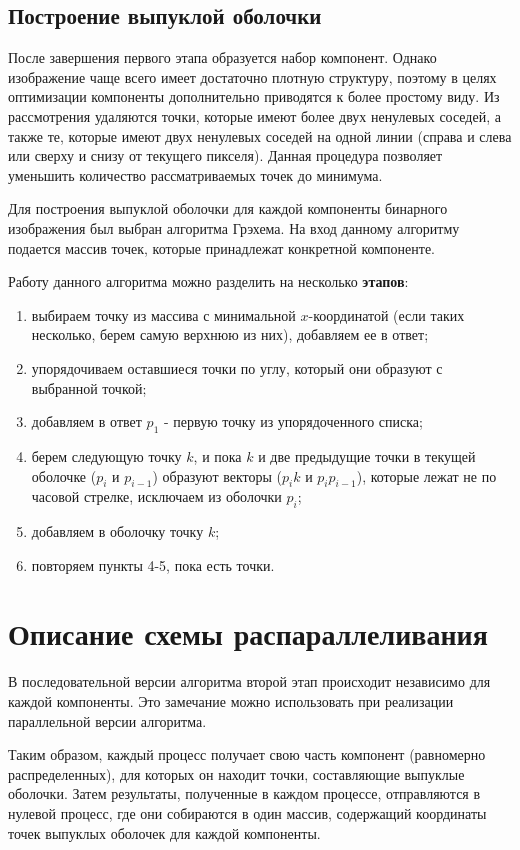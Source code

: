 \documentclass[a4paper, 12pt]{extarticle}
\newcommand{\n}{\par}
\begin{document}
	\subsection{Построение выпуклой оболочки}
	После завершения первого этапа образуется набор компонент. Однако изображение чаще всего имеет достаточно плотную структуру, поэтому в целях оптимизации компоненты дополнительно приводятся к более простому виду. Из рассмотрения удаляются точки, которые имеют более двух ненулевых соседей, а также те, которые имеют двух ненулевых соседей на одной линии (справа и слева или сверху и снизу от текущего пикселя). Данная процедура позволяет уменьшить количество рассматриваемых точек до минимума.\n
	Для построения выпуклой оболочки для каждой компоненты бинарного изображения был выбран алгоритма Грэхема. На вход данному алгоритму подается массив точек, которые принадлежат конкретной компоненте.\n
	Работу данного алгоритма можно разделить на несколько \textbf{этапов}:
	\begin{enumerate}
		\item выбираем точку из массива с минимальной $x$-координатой (если таких несколько, берем самую верхнюю из них), добавляем ее в ответ;
		\item упорядочиваем оставшиеся точки по углу, который они образуют с выбранной точкой;
		\item добавляем в ответ $p_1$ - первую точку из упорядоченного списка;
		\item берем следующую точку $k$, и пока $k$ и две предыдущие точки в текущей оболочке ($p_i$ и $p_{i-1}$) образуют векторы ($p_i$$k$ и $p_i$$p_{i-1}$), которые лежат не по часовой стрелке, исключаем из оболочки $p_i$;
		\item добавляем в оболочку точку $k$;
		\item повторяем пункты 4-5, пока есть точки.
	\end{enumerate}
	\newpage
	\section{Описание схемы распараллеливания}
	В последовательной версии алгоритма второй этап происходит независимо для каждой компоненты. Это замечание можно использовать при реализации параллельной версии алгоритма.\n
	Таким образом, каждый процесс получает свою часть компонент (равномерно распределенных), для которых он находит точки, составляющие выпуклые оболочки. Затем результаты, полученные в каждом процессе, отправляются в нулевой процесс, где они собираются в один массив, содержащий координаты точек выпуклых оболочек для каждой компоненты.
	\newpage
\end{document}
